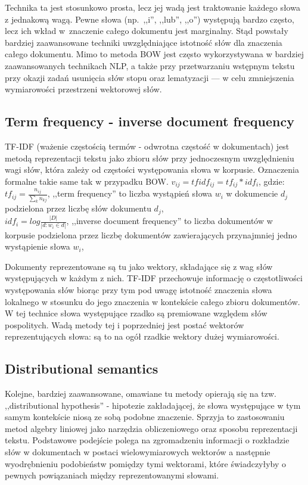 \documentclass[pl]{minipw} %
\begin{document}
Technika ta jest stosunkowo prosta, lecz jej wadą jest traktowanie każdego słowa z jednakową wagą. Pewne słowa (np.~,,i'', ,,lub'', ,,o'') występują bardzo często, lecz ich wkład w~znaczenie całego dokumentu jest marginalny. Stąd powstały bardziej zaawansowane techniki uwzględniające istotność słów dla znaczenia całego dokumentu. Mimo to metoda BOW jest często wykorzystywana w bardziej zaawansowanych technikach NLP, a także przy przetwarzaniu wstępnym tekstu przy okazji zadań usunięcia słów stopu oraz lematyzacji --- w celu zmniejszenia wymiarowości przestrzeni wektorowej słów.
\subsection{Term frequency - inverse document frequency}

TF-IDF \cite{tf_idf} (ważenie częstością termów - odwrotna częstość w dokumentach) jest metodą reprezentacji tekstu jako zbioru słów przy jednoczesnym uwzględnieniu wagi słów, która zależy od częstości występowania słowa w korpusie.  Oznaczenia formalne takie same tak w przypadku BOW.
$v_{ij} = tfidf_{ij} = tf_{ij} * idf_i$, gdzie:\\
$tf_{ij} = \frac{n_{ij}}{\sum\limits_{k}n_{kj}}$, ,,term frequency'' to liczba wystąpień słowa $w_i$ w dokumencie $d_j$ podzielona przez liczbę słów dokumentu $d_j$,\\
$idf_i = log\frac{|D|}{|{d:w_i \in d}|}$, ,,inverse document frequency'' to liczba dokumentów w korpusie podzielona przez liczbę dokumentów zawierających przynajmniej jedno wystąpienie słowa $w_i$,

Dokumenty reprezentowane są tu jako wektory, składające się z wag słów występujących w każdym z nich. TF-IDF przechowuje informację o częstotliwości występowania słów biorąc przy tym pod uwagę istotność znaczenia słowa lokalnego w stosunku do jego znaczenia w kontekście całego zbioru dokumentów. W tej technice słowa występujące rzadko są premiowane względem słów pospolitych. Wadą metody tej i poprzedniej jest postać wektorów reprezentujących słowa: są to na ogół rzadkie wektory dużej wymiarowości.

\subsection{Distributional semantics}
Kolejne, bardziej zaawansowane, omawiane tu metody opierają się na tzw. ,,distributional hypothesis'' - hipotezie zakładającej, że słowa występujące w tym samym kontekście niosą ze sobą podobne znaczenie\cite{bow}\cite{firth}. Sprzyja to zastosowaniu metod algebry liniowej jako narzędzia obliczeniowego oraz sposobu reprezentacji tekstu. Podstawowe podejście polega na zgromadzeniu informacji o rozkładzie słów w dokumentach w postaci wielowymiarowych wektorów a następnie wyodrębnieniu podobieństw pomiędzy tymi wektorami, które świadczyłyby o pewnych powiązaniach między reprezentowanymi słowami. 
\end{document}
